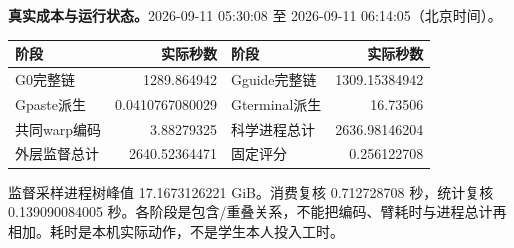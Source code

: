 \documentclass[UTF8,10pt,a4paper]{ctexart}
\begin{document}
\textbf{真实成本与运行状态。}2026-09-11 05:30:08 至 2026-09-11 06:14:05（北京时间）。
\begin{center}\small\begin{tabular}{lrlr}\toprule
阶段 & 实际秒数 & 阶段 & 实际秒数\\\midrule
G0完整链 & 1289.864942 & Gguide完整链 & 1309.15384942\\
Gpaste派生 & 0.0410767080029 & Gterminal派生 & 16.73506\\
共同warp编码 & 3.88279325 & 科学进程总计 & 2636.98146204\\
外层监督总计 & 2640.52364471 & 固定评分 & 0.256122708\\
\bottomrule\end{tabular}\end{center}
监督采样进程树峰值 17.1673126221 GiB。消费复核 0.712728708 秒，统计复核 0.139090084005 秒。各阶段是包含/重叠关系，不能把编码、臂耗时与进程总计再相加。耗时是本机实际动作，不是学生本人投入工时。

\clearpage
\end{document}
